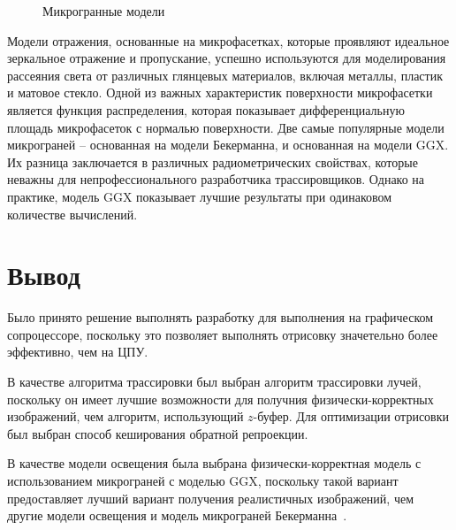 \begin{figure}[htbp]
  \centering
  
  \caption{Микрогранные модели}
\end{figure}

Модели отражения, основанные на микрофасетках, которые проявляют идеальное 
зеркальное отражение и пропускание, успешно используются для моделирования 
рассеяния света от различных глянцевых материалов, включая металлы, пластик 
и матовое стекло.
Одной из важных характеристик поверхности микрофасетки является функция 
распределения, которая показывает дифференциальную площадь микрофасеток 
с нормалью поверхности. Две самые популярные модели микрограней -- 
основанная на модели Бекерманна, и основанная на модели GGX. Их разница 
заключается в различных радиометрических свойствах, которые неважны
для непрофессионального разработчика трассировщиков. Однако на практике,
модель GGX показывает лучшие результаты при одинаковом количестве вычислений.
~\cite{PBRT3e}~\cite{MMfRtRS}

\section{Вывод}

Было принято решение выполнять разработку для выполнения на графическом сопроцессоре,
поскольку это позволяет выполнять отрисовку значетельно более эффективно, чем на ЦПУ.

В качестве алгоритма трассировки был выбран алгоритм трассировки лучей, поскольку он имеет
лучшие возможности для получния физически-корректных изображений, чем 
алгоритм, использующий $z$-буфер.
Для оптимизации отрисовки был выбран способ кеширования 
обратной репроекции.

В качестве модели освещения была выбрана физически-корректная модель с использованием
микрограней с моделью GGX, поскольку такой вариант предоставляет лучший вариант
получения реалистичных изображений, чем другие модели освещения и модель микрограней Бекерманна~\cite{MMfRtRS}.
